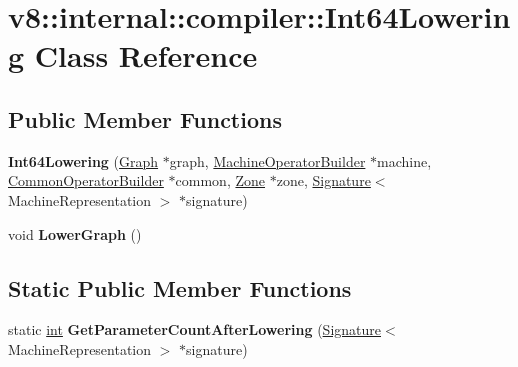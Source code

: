 \hypertarget{classv8_1_1internal_1_1compiler_1_1Int64Lowering}{}\section{v8\+:\+:internal\+:\+:compiler\+:\+:Int64\+Lowering Class Reference}
\label{classv8_1_1internal_1_1compiler_1_1Int64Lowering}
\subsection*{Public Member Functions}
\begin{DoxyCompactItemize}
\item 
\mbox{\label{classv8_1_1internal_1_1compiler_1_1Int64Lowering_ac38833d8906d52be233f57cbd5dea980}} 
{\bfseries Int64\+Lowering} (\mbox{\hyperlink{classv8_1_1internal_1_1compiler_1_1Graph}{Graph}} $\ast$graph, \mbox{\hyperlink{classv8_1_1internal_1_1compiler_1_1MachineOperatorBuilder}{Machine\+Operator\+Builder}} $\ast$machine, \mbox{\hyperlink{classv8_1_1internal_1_1compiler_1_1CommonOperatorBuilder}{Common\+Operator\+Builder}} $\ast$common, \mbox{\hyperlink{classv8_1_1internal_1_1Zone}{Zone}} $\ast$zone, \mbox{\hyperlink{classv8_1_1internal_1_1Signature}{Signature}}$<$ Machine\+Representation $>$ $\ast$signature)
\item 
\mbox{\label{classv8_1_1internal_1_1compiler_1_1Int64Lowering_ac51d0bc0181a103e5f091d93c5951781}} 
void {\bfseries Lower\+Graph} ()
\end{DoxyCompactItemize}
\subsection*{Static Public Member Functions}
\begin{DoxyCompactItemize}
\item 
\mbox{\label{classv8_1_1internal_1_1compiler_1_1Int64Lowering_ac188b7289ff3213f6ce231e980f88690}} 
static \mbox{\hyperlink{classint}{int}} {\bfseries Get\+Parameter\+Count\+After\+Lowering} (\mbox{\hyperlink{classv8_1_1internal_1_1Signature}{Signature}}$<$ Machine\+Representation $>$ $\ast$signature)
\end{DoxyCompactItemize}


